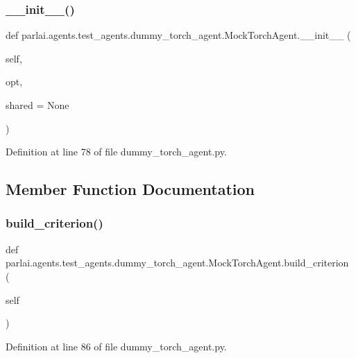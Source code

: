 \subsubsection{\texorpdfstring{\+\_\+\+\_\+init\+\_\+\+\_\+()}{\_\_init\_\_()}}
{\footnotesize\ttfamily def parlai.\+agents.\+test\+\_\+agents.\+dummy\+\_\+torch\+\_\+agent.\+Mock\+Torch\+Agent.\+\_\+\+\_\+init\+\_\+\+\_\+ (\begin{DoxyParamCaption}\item[{}]{self,  }\item[{}]{opt,  }\item[{}]{shared = {\ttfamily None} }\end{DoxyParamCaption})}



Definition at line 78 of file dummy\+\_\+torch\+\_\+agent.\+py.



\subsection{Member Function Documentation}
\mbox{\label{classparlai_1_1agents_1_1test__agents_1_1dummy__torch__agent_1_1MockTorchAgent_a457b269132e6c4ec92308ce87aa85336}} 
\subsubsection{\texorpdfstring{build\+\_\+criterion()}{build\_criterion()}}
{\footnotesize\ttfamily def parlai.\+agents.\+test\+\_\+agents.\+dummy\+\_\+torch\+\_\+agent.\+Mock\+Torch\+Agent.\+build\+\_\+criterion (\begin{DoxyParamCaption}\item[{}]{self }\end{DoxyParamCaption})}



Definition at line 86 of file dummy\+\_\+torch\+\_\+agent.\+py.

